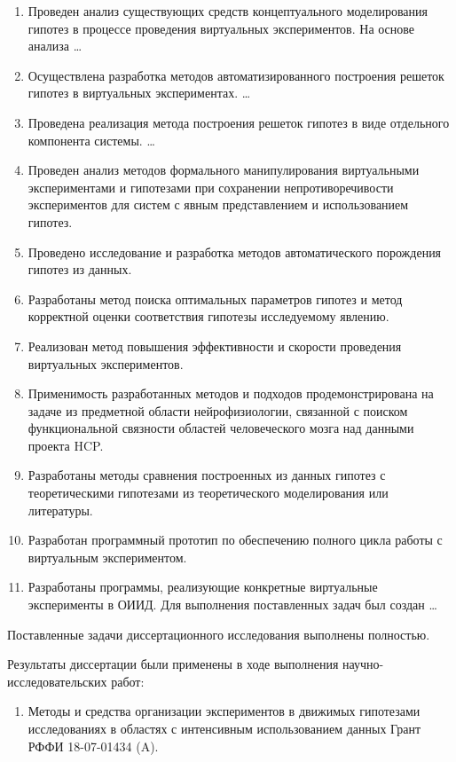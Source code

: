 \begin{enumerate}
  \item Проведен анализ существующих средств концептуального моделирования гипотез в процессе проведения виртуальных экспериментов. На основе анализа \ldots
  \item Осуществлена разработка методов автоматизированного построения решеток гипотез в виртуальных экспериментах. \ldots
  \item Проведена реализация метода построения решеток гипотез в виде отдельного компонента системы. \ldots
  \item Проведен анализ методов формального манипулирования виртуальными экспериментами и гипотезами при сохранении непротиворечивости экспериментов для систем с явным представлением и использованием гипотез.
  \item Проведено исследование и разработка методов автоматического порождения гипотез из данных.
  \item Разработаны метод поиска оптимальных параметров гипотез и метод корректной оценки соответствия гипотезы исследуемому явлению.
  \item Реализован метод повышения эффективности и скорости проведения виртуальных экспериментов.
  \item Применимость разработанных методов и подходов продемонстрирована на задаче из предметной области нейрофизиологии, связанной с поиском функциональной связности областей человеческого мозга над данными проекта HCP.
  \item Разработаны методы сравнения построенных из данных гипотез с теоретическими гипотезами из теоретического моделирования или литературы.
  \item Разработан программный прототип по обеспечению полного цикла работы с виртуальным экспериментом.
  
  \item Разработаны программы, реализующие конкретные виртуальные эксперименты в ОИИД. Для выполнения поставленных задач был создан \ldots
\end{enumerate}

Поставленные задачи диссертационного исследования выполнены полностью.

Результаты диссертации были применены в ходе выполнения научно-исследовательских работ:
\begin{enumerate}
    \item Методы и средства организации экспериментов в движимых гипотезами исследованиях в областях с интенсивным использованием данных Грант РФФИ 18-07-01434 (A).
\end{enumerate}